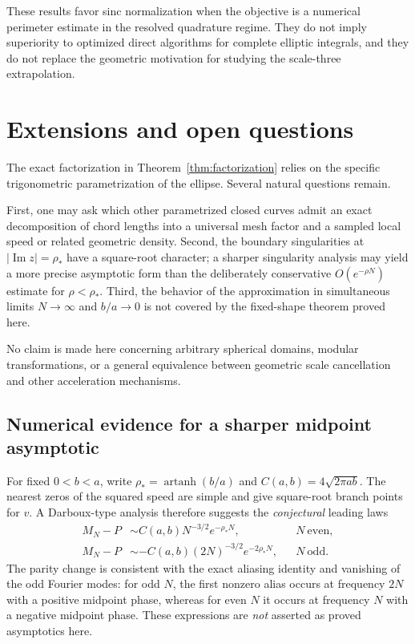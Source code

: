 \documentclass[11pt]{article}
\theoremstyle{definition}
\numberwithin{equation}{section}
\begin{document}
These results favor sinc normalization when the objective is a
numerical perimeter estimate in the resolved quadrature regime.
They do not imply superiority to optimized direct algorithms for
complete elliptic integrals, and they do not replace the geometric
motivation for studying the scale-three extrapolation.

\section{Extensions and open questions}

The exact factorization in Theorem~\ref{thm:factorization} relies on the
specific trigonometric parametrization of the ellipse.  Several natural
questions remain.

First, one may ask which other parametrized closed curves admit an
exact decomposition of chord lengths into a universal mesh factor and
a sampled local speed or related geometric density.  Second, the
boundary singularities at \(|\operatorname{Im}z|=\rho_*\) have a
square-root character; a sharper singularity analysis may yield a
more precise asymptotic form than the deliberately conservative
\(O(e^{-\rho N})\) estimate for \(\rho<\rho_*\).  Third, the behavior of
the approximation in simultaneous limits \(N\to\infty\) and \(b/a\to0\)
is not covered by the fixed-shape theorem proved here.

No claim is made here concerning arbitrary spherical domains, modular
transformations, or a general equivalence between geometric scale
cancellation and other acceleration mechanisms.

\subsection{Numerical evidence for a sharper midpoint asymptotic}
\label{sec:sharp-conjecture}

For fixed $0<b<a$, write $\rho_*=\operatorname{artanh}(b/a)$ and
$C(a,b)=4\sqrt{2\pi ab}$.  The nearest zeros of the squared speed are
simple and give square-root branch points for $v$.  A Darboux-type
analysis therefore suggests the \emph{conjectural} leading laws
\begin{align}
 M_N-P &\sim C(a,b)N^{-3/2}e^{-\rho_*N}, &&N\ \text{even},\label{eq:sharp-even}\\
 M_N-P &\sim -C(a,b)(2N)^{-3/2}e^{-2\rho_*N},&&N\ \text{odd}.\label{eq:sharp-odd}
\end{align}
The parity change is consistent with the exact aliasing identity and
vanishing of the odd Fourier modes: for odd $N$, the first nonzero alias
occurs at frequency $2N$ with a positive midpoint phase, whereas for
even $N$ it occurs at frequency $N$ with a negative midpoint phase.
These expressions are \emph{not} asserted as proved asymptotics here.
\end{document}
